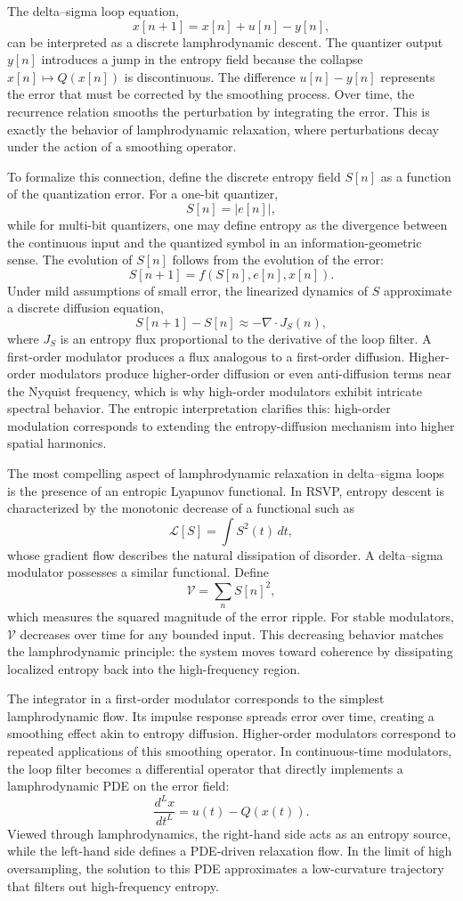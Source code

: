 The delta–sigma loop equation,
\[
x[n+1] = x[n] + u[n] - y[n],
\]
can be interpreted as a discrete lamphrodynamic descent. The quantizer output \(y[n]\) introduces a jump in the entropy field because the collapse \(x[n] \mapsto Q(x[n])\) is discontinuous. The difference \(u[n] - y[n]\) represents the error that must be corrected by the smoothing process. Over time, the recurrence relation smooths the perturbation by integrating the error. This is exactly the behavior of lamphrodynamic relaxation, where perturbations decay under the action of a smoothing operator.

To formalize this connection, define the discrete entropy field \(S[n]\) as a function of the quantization error. For a one-bit quantizer,
\[
S[n] = | e[n] |,
\]
while for multi-bit quantizers, one may define entropy as the divergence between the continuous input and the quantized symbol in an information-geometric sense. The evolution of \(S[n]\) follows from the evolution of the error:
\[
S[n+1] = f(S[n], e[n], x[n]).
\]
Under mild assumptions of small error, the linearized dynamics of \(S\) approximate a discrete diffusion equation,
\[
S[n+1] - S[n] \approx -\nabla \cdot J_{S}(n),
\]
where \(J_{S}\) is an entropy flux proportional to the derivative of the loop filter. A first-order modulator produces a flux analogous to a first-order diffusion. Higher-order modulators produce higher-order diffusion or even anti-diffusion terms near the Nyquist frequency, which is why high-order modulators exhibit intricate spectral behavior. The entropic interpretation clarifies this: high-order modulation corresponds to extending the entropy-diffusion mechanism into higher spatial harmonics.

The most compelling aspect of lamphrodynamic relaxation in delta–sigma loops is the presence of an entropic Lyapunov functional. In RSVP, entropy descent is characterized by the monotonic decrease of a functional such as
\[
\mathcal{L}[S] = \int S^{2}(t) \, dt,
\]
whose gradient flow describes the natural dissipation of disorder. A delta–sigma modulator possesses a similar functional. Define
\[
\mathcal{V} = \sum_{n} S[n]^{2},
\]
which measures the squared magnitude of the error ripple. For stable modulators, \(\mathcal{V}\) decreases over time for any bounded input. This decreasing behavior matches the lamphrodynamic principle: the system moves toward coherence by dissipating localized entropy back into the high-frequency region.

The integrator in a first-order modulator corresponds to the simplest lamphrodynamic flow. Its impulse response spreads error over time, creating a smoothing effect akin to entropy diffusion. Higher-order modulators correspond to repeated applications of this smoothing operator. In continuous-time modulators, the loop filter becomes a differential operator that directly implements a lamphrodynamic PDE on the error field:
\[
\frac{d^{L} x}{d t^{L}} = u(t) - Q(x(t)).
\]
Viewed through lamphrodynamics, the right-hand side acts as an entropy source, while the left-hand side defines a PDE-driven relaxation flow. In the limit of high oversampling, the solution to this PDE approximates a low-curvature trajectory that filters out high-frequency entropy.

